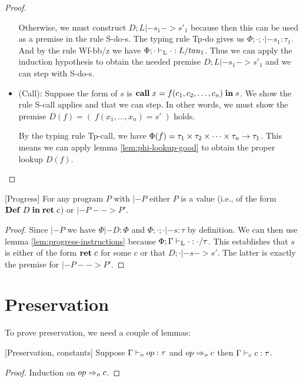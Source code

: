 \documentclass[a4paper, oneside, 10pt, draft]{memoir}
\begin{document}
\begin{proof}
\begin{itemize}
    Otherwise, we must construct $D;L |- s_1 -> s'_1$ because then
    this can be used as a premise in the rule S-do-s. The typing rule
    Tp-do gives us $\Phi;\cdot;\cdot |- s_1 : \tau_1$. And by the rule
    Wf-bb/z we have $\Phi;\cdot |-_{\mathrm{L}} \cdot : L / tau_1$. Thus we can
    apply the induction hypothesis to obtain the needed premise $D;L
    |- s_1 -> s'_1$ and we can step with S-do-s.
  \item (Call): Suppose the form of $s$ is $\mathbf{call} \; x = f (c_1, c_2,
      \dotsc, c_n)\; \mathbf{in} \; s$. We show the rule S-call applies and that we
    can step. In other words, we must show the premise $D(f) = (\;
    f(x_1, \dotsc, x_n) = s' \;)$ holds.

    By the typing rule Tp-call, we have $\Phi(f) = \tau_1 \times \tau_2 \times \dotsb \times \tau_n -> \tau_1$. This
    means we can apply lemma \ref{lem:phi-lookup-good} to obtain the
    proper lookup $D(f)$.
  \end{itemize}
\end{proof}

\begin{thm}{[Progress]}
  For any program $P$ with $|- P$ either $P$ is a value (i.e., of the
  form $\mathbf{Def} \; D \; \mathbf{in} \; \mathbf{ret} \; c$) or $|- P --> P'$.
\end{thm}
\begin{proof}
  Since $|- P$ we have $\Phi |- D : \Phi$ and $\Phi;\cdot;\cdot |- s :
  \tau$ by definition. We can then use lemma
  \ref{lem:progress-instructions} because $\Phi;\Gamma |-_{\mathrm{L}} \cdot :
  \cdot / \tau$. This establishes that $s$ is either of the form
  $\mathbf{ret} \; c$ for some $c$ or that $D;\cdot |- s -> s'$. The latter is
  exactly the premise for $|- P --> P'$.
\end{proof}

\section{Preservation}

To prove preservation, we need a couple of lemmas:

\begin{lem}{[Preservation, constants]}
  \label{lem:preservation-c}
  Suppose $\Gamma |-_{\mathrm{o}} op : \tau$ and $op =>_{o} c$ then $\Gamma |-_{\mathrm{c}}
  c : \tau$.
\end{lem}
\begin{proof}
  Induction on $op =>_{o} c$.
\end{proof}
\end{document}
